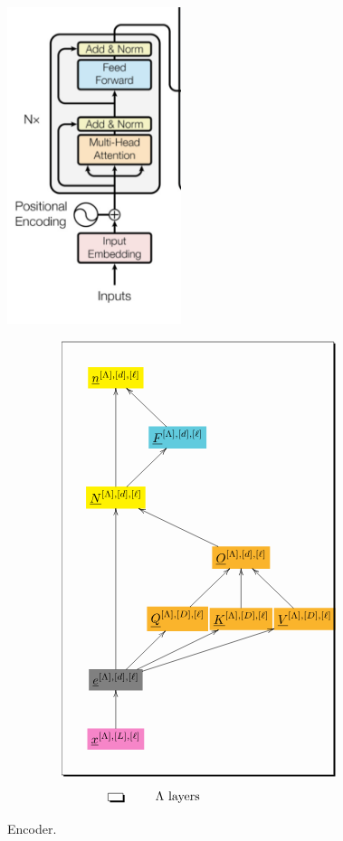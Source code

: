 \documentclass[12pt]{article}
\begin{document}
\begin{figure}[h!]\centering
\begin{minipage}{.4\linewidth}
\includegraphics[width=2in]{encoder.jpg}
\end{minipage}%
\begin{minipage}{.6\linewidth}
$$\xymatrix@R=2.5pc@C=0.1pc{
*+[F*:yellow]{\underline{n}^{[\Lambda],[d], [\ell]}}&&&
\\
&*+[F*:SkyBlue]{\underline{F}^{[\Lambda],[d], [\ell]}}\ar[ul]&&
\\
*+[F*:yellow]{\underline{N}^{[\Lambda],[d], [\ell]}}\ar[ur]\ar[uu]&&&
\\
&&*+[F*:Dandelion]{\underline{O}^{[\Lambda],[d], [\ell]}}\ar[ull]&
\\
&*+[F*:Dandelion]{\underline{Q}^{[\Lambda],[D], [\ell]}}\ar[ur]&*+[F*:Dandelion]{\underline{K}^{[\Lambda],[D], [\ell]}}\ar[u]&*+[F*:Dandelion]{\underline{V}^{[\Lambda],[D], [\ell]}}\ar[ul]
\\
*+[F*:gray]{\underline{e}^{[\Lambda],[d], [\ell]}}\ar[urr]\ar[uuu]\ar[ur]\ar[urrr]&&&
\\
*+[F*:Lavender]{\underline{x}^{[\Lambda],[L],[\ell]}}\ar[u]&&&
\save
\POS"1,1"."7,1"."1,4"."7,4"!C*+<4.0em>\frm{-,}
\restore
\\
*+[F-,]{\;\;}&\text{$\Lambda$ layers}
}$$
\end{minipage}
\caption{Encoder.}
\label{fig-texnn-for-encoder}
\end{figure}
\end{document}

